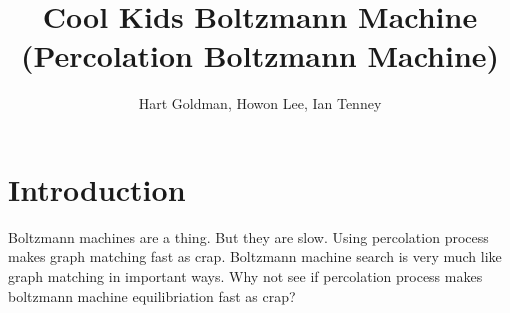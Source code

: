\documentclass[12pt]{article}
\begin{document}
\title{Cool Kids Boltzmann Machine (Percolation Boltzmann Machine)}
\author{Hart Goldman, Howon Lee, Ian Tenney}
\maketitle

\section{Introduction}
Boltzmann machines are a thing. But they are slow. Using percolation process makes graph matching fast as crap. Boltzmann machine search is very much like graph matching in important ways. Why not see if percolation process makes boltzmann machine equilibriation fast as crap?
\end{document}
